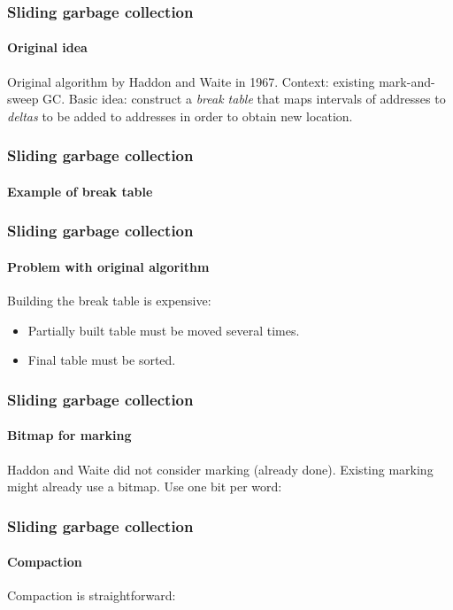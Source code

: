 \documentclass{beamer}
\def\inputfig#1{}
\begin{document}
\begin{frame}
  \frametitle{Sliding garbage collection} 
  \framesubtitle{Original idea}

  Original algorithm by Haddon and Waite in 1967.
  \vskip 0.5cm
  Context: existing mark-and-sweep GC.
  \vskip 0.5cm
  Basic idea: construct a \emph{break table} that maps intervals of
  addresses to \emph{deltas} to be added to addresses in order to
  obtain new location. 

\end{frame}
\begin{frame}
  \frametitle{Sliding garbage collection} 
  \framesubtitle{Example of break table}
  \begin{center}
\inputfig{fig-example-aa.pdf_t}
  \end{center}

  \begin{center}
\inputfig{fig-example-da.pdf_t}
  \end{center}

\end{frame}
\begin{frame}
  \frametitle{Sliding garbage collection} 
  \framesubtitle{Problem with original algorithm}

    Building the break table is expensive:

    \begin{itemize}
    \item Partially built table must be moved several times.
    \item Final table must be sorted.  
    \end{itemize}

\end{frame}
\begin{frame}
  \frametitle{Sliding garbage collection} 
  \framesubtitle{Bitmap for marking}

  Haddon and Waite did not consider marking (already done).  Existing
  marking might already use a bitmap.
  \vskip 1cm
  Use one bit per word:

  \begin{center}
\inputfig{fig-example-a.pdf_t}
  \end{center}
\end{frame}
\begin{frame}
  \frametitle{Sliding garbage collection} 
  \framesubtitle{Compaction}

  Compaction is straightforward:

  \begin{center}
\inputfig{fig-example-b.pdf_t}
  \end{center}

  \begin{center}
\inputfig{fig-example-c.pdf_t}
  \end{center}

\end{frame}
\end{document}
